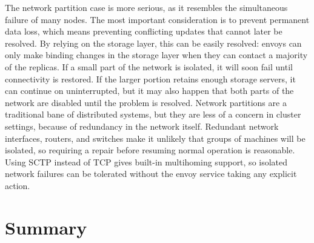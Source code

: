 The network partition case is more serious, as it resembles the simultaneous failure of many nodes. The most important consideration is to prevent permanent data loss, which means preventing conflicting updates that cannot later be resolved. By relying on the storage layer, this can be easily resolved: envoys can only make binding changes in the storage layer when they can contact a majority of the replicas. If a small part of the network is isolated, it will soon fail until connectivity is restored. If the larger portion retains enough storage servers, it can continue on uninterrupted, but it may also happen that both parts of the network are disabled until the problem is resolved. Network partitions are a traditional bane of distributed systems, but they are less of a concern in cluster settings, because of redundancy in the network itself. Redundant network interfaces, routers, and switches make it unlikely that groups of machines will be isolated, so requiring a repair before resuming normal operation is reasonable. Using SCTP \cite{stewart} instead of TCP gives built-in multihoming support, so isolated network failures can be tolerated without the envoy service taking any explicit action.

\section{Summary}

% 
